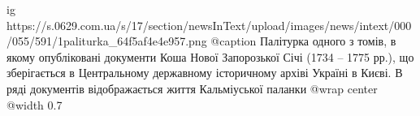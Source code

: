  
 
 
 
 

\ifcmt
  ig https://s.0629.com.ua/s/17/section/newsInText/upload/images/news/intext/000/055/591/1paliturka_64f5af4e4e957.png
	@caption Палітурка одного з томів, в якому опубліковані документи Коша Нової Запорозької Січі (1734 – 1775 рр.), що зберігається в Центральному державному історичному архіві Україні в Києві. В ряді документів відображається життя Кальміуської паланки
  @wrap center
  @width 0.7
\fi
